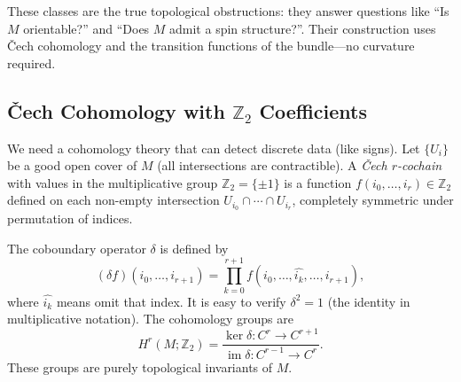 \documentclass[11pt]{article}
\newcommand{\Z}{\mathbb{Z}}
\begin{document}
These classes are the true topological obstructions: they answer questions like ``Is \(M\) orientable?'' and ``Does \(M\) admit a spin structure?''. Their construction uses Čech cohomology and the transition functions of the bundle---no curvature required.

\subsection{Čech Cohomology with \(\Z_2\) Coefficients}
We need a cohomology theory that can detect discrete data (like signs). Let \(\{U_i\}\) be a good open cover of \(M\) (all intersections are contractible). A \emph{Čech \(r\)-cochain} with values in the multiplicative group \(\Z_2 = \{\pm 1\}\) is a function \(f(i_0,\dots,i_r) \in \Z_2\) defined on each non-empty intersection \(U_{i_0}\cap\cdots\cap U_{i_r}\), completely symmetric under permutation of indices.

The coboundary operator \(\delta\) is defined by
\[
(\delta f)(i_0,\dots,i_{r+1}) = \prod_{k=0}^{r+1} f(i_0,\dots,\widehat{i_k},\dots,i_{r+1}),
\]
where \(\widehat{i_k}\) means omit that index. It is easy to verify \(\delta^2 = 1\) (the identity in multiplicative notation). The cohomology groups are
\[
H^r(M;\Z_2) = \frac{\ker \delta: C^r \to C^{r+1}}{\operatorname{im} \delta: C^{r-1} \to C^r}.
\]
These groups are purely topological invariants of \(M\).
\end{document}
